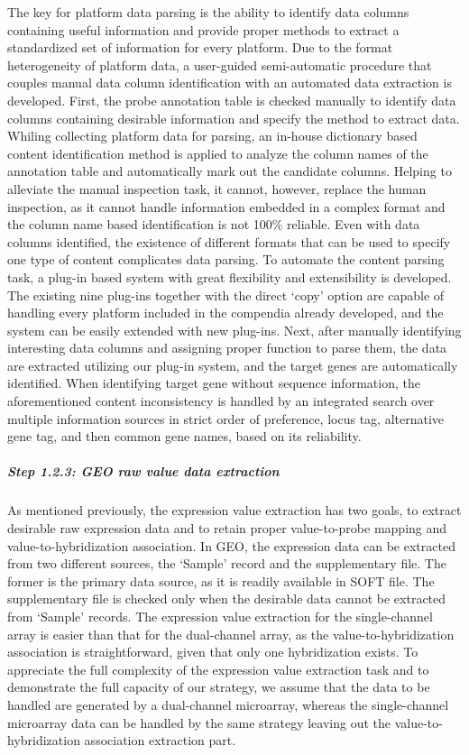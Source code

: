 The key for platform data parsing is the ability to identify data columns containing useful information and provide proper methods to extract a standardized set of information for every platform. Due to the format heterogeneity of platform data, a user-guided semi-automatic procedure that couples manual data column identification with an automated data extraction is developed. First, the probe annotation table is checked manually to identify data columns containing desirable information and specify the method to extract data. Whiling collecting platform data for parsing, an in-house dictionary based content identification method is applied to analyze the column names of the annotation table and automatically mark out the candidate columns. Helping to alleviate the manual inspection task, it cannot, however, replace the human inspection, as it cannot handle information embedded in a complex format and the column name based identification is not 100\% reliable. Even with data columns identified, the existence of different formats that can be used to specify one type of content complicates data parsing. To automate the content parsing task, a plug-in based system with great flexibility and extensibility is developed. The existing nine plug-ins together with the direct `copy' option are capable of handling every platform included in the compendia already developed, and the system can be easily extended with new plug-ins. Next, after manually identifying interesting data columns and assigning proper function to parse them, the data are extracted utilizing our plug-in system, and the target genes are automatically identified. When identifying target gene without sequence information, the aforementioned content inconsistency is handled by an integrated search over multiple information sources in strict order of preference, locus tag, alternative gene tag, and then common gene names, based on its reliability.


\subparagraph{Step 1.2.3: GEO raw value data extraction}  As mentioned previously, the expression value extraction has two goals, to extract desirable raw expression data and to retain proper value-to-probe mapping and value-to-hybridization association. In GEO, the expression data can be extracted from two different sources, the `Sample' record and the supplementary file. The former is the primary data source, as it is readily available in SOFT file.  The supplementary file is checked only when the desirable data cannot be extracted from `Sample' records. The expression value extraction for the single-channel array is easier than that for the dual-channel array, as the value-to-hybridization association is straightforward, given that only one hybridization exists. To appreciate the full complexity of the expression value extraction task and to demonstrate the full capacity of our strategy, we assume that the data to be handled are generated by a dual-channel microarray, whereas the single-channel microarray data can be handled by the same strategy leaving out the value-to-hybridization association extraction part.





